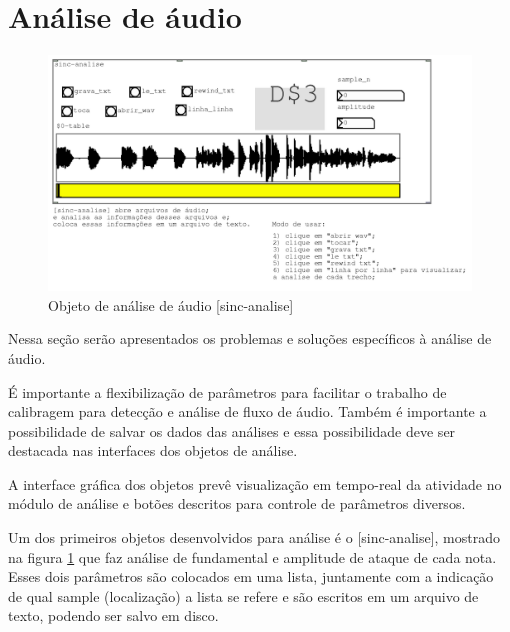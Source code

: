 \documentclass{ppgmus}
\begin{document}






\section{Análise de áudio}

\begin{figure}
\includegraphics[scale=.6]{sinc-analise}
\caption{Objeto de análise de áudio [sinc-analise]}
\label{sinc-analise}
\end{figure}


Nessa seção serão apresentados os problemas e soluções específicos
à análise de áudio. 

É importante a flexibilização de parâmetros para facilitar
o trabalho de calibragem para detecção e análise de fluxo de áudio.
Também é importante a possibilidade de salvar os dados das análises 
e essa possibilidade deve ser destacada nas interfaces dos objetos de análise.

A interface gráfica dos objetos prevê visualização em tempo-real
da atividade no módulo de análise e botões descritos para controle
de parâmetros diversos.

Um dos primeiros objetos desenvolvidos para análise é o [sinc-analise],
mostrado na figura \ref{sinc-analise} que faz análise de fundamental e amplitude
de ataque de cada nota. Esses dois parâmetros são colocados em uma lista, juntamente com a indicação
de qual sample (localização) a lista se refere e são escritos em um arquivo de texto, podendo
ser salvo em disco.
\end{document}
